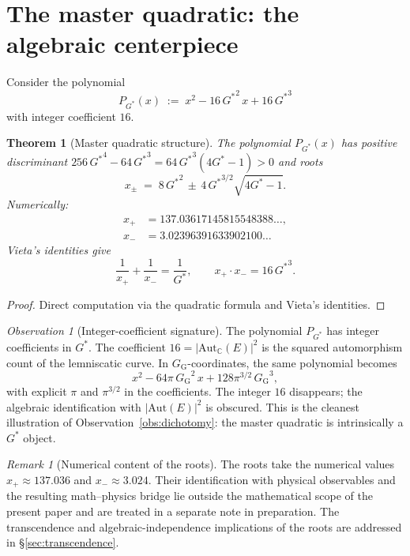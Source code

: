 \documentclass[11pt]{article}
\newtheorem{theorem}{Theorem}[section]
\theoremstyle{definition}
\theoremstyle{remark}
\newtheorem*{remark}{Remark}
\newtheorem*{observation}{Observation}
\newcommand{\Gs}{G^{*}}
\newcommand{\Gss}{{G^{*}}^{2}}
\newcommand{\Gsss}{{G^{*}}^{3}}
\newcommand{\GG}{G_{\!\scriptscriptstyle\mathrm{G}}}
\newcommand{\C}{\mathbb{C}}
\newcommand{\Aut}{\mathrm{Aut}}
\begin{document}
\section{The master quadratic: the algebraic centerpiece}\label{sec:masterq}

Consider the polynomial
\begin{equation}
\boxed{\;P_{\!\Gs}(x) \;:=\; x^2 - 16\,\Gss\,x + 16\,\Gsss\;} \label{eq:MQ}
\end{equation}
with integer coefficient $16$.

\begin{theorem}[Master quadratic structure]\label{thm:MQ}
The polynomial $P_{\!\Gs}(x)$ has positive discriminant
$256\,{\Gs}^4 - 64\,{\Gs}^3 = 64\,{\Gs}^3(4\Gs - 1) > 0$ and roots
\[
x_\pm \;=\; 8\,\Gss \,\pm\, 4\,{\Gs}^{3/2}\sqrt{4\Gs - 1}.
\]
Numerically:
\begin{align}
x_+ &= 137.03617145815548388\ldots, \\
x_- &= 3.02396391633902100\ldots
\end{align}
Vieta's identities give
\begin{equation}
\frac{1}{x_+} + \frac{1}{x_-} = \frac{1}{\Gs}, \qquad
x_+ \cdot x_- = 16\,\Gsss.
\label{eq:vieta}
\end{equation}
\end{theorem}

\begin{proof}
Direct computation via the quadratic formula and Vieta's identities.
\end{proof}

\begin{observation}[Integer-coefficient signature]\label{obs:MQ-integer}
The polynomial $P_{\!\Gs}$ has integer coefficients in $\Gs$. The
coefficient $16 = |\Aut_\C(E)|^2$ is the squared automorphism count of the
lemniscatic curve. In $\GG$-coordinates, the same polynomial becomes
\[
x^2 - 64\pi\,{\GG}^2\,x + 128\pi^{3/2}\,{\GG}^3,
\]
with explicit $\pi$ and $\pi^{3/2}$ in the coefficients. The integer $16$
disappears; the algebraic identification with $|\Aut(E)|^2$ is obscured.
This is the cleanest illustration of Observation~\ref{obs:dichotomy}:
the master quadratic is intrinsically a $\Gs$ object.
\end{observation}

\begin{remark}[Numerical content of the roots]\label{rem:MQ-numerical}
The roots take the numerical values $x_+ \approx 137.036$ and
$x_- \approx 3.024$. Their identification with physical observables
and the resulting math--physics bridge lie outside the mathematical
scope of the present paper and are treated in a separate note in
preparation. The transcendence and algebraic-independence
implications of the roots are addressed in \S\ref{sec:transcendence}.
\end{remark}
\end{document}
